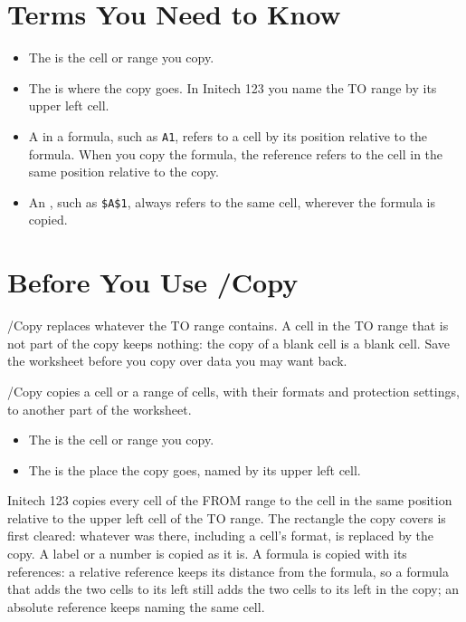 \section{Terms You Need to Know}
\begin{itemize}
\item The  is the cell or range you copy.
\item The  is where the copy goes.  In Initech 123 you name
  the TO range by its upper left cell.
\item A  in a formula, such as \texttt{A1}, refers
  to a cell by its position relative to the formula.  When you copy the
  formula, the reference refers to the cell in the same position relative
  to the copy.
\item An , such as \texttt{\$A\$1}, always refers
  to the same cell, wherever the formula is copied.
\end{itemize}

\section{Before You Use /Copy}
\begin{Caution}
/Copy replaces whatever the TO range contains.  A cell in the TO range that
is not part of the copy keeps nothing: the copy of a blank cell is a blank
cell.  Save the worksheet before you copy over data you may want back.
\end{Caution}

/Copy copies a cell or a range of cells, with their formats and protection
settings, to another part of the worksheet.


\begin{itemize}
\item The  is the cell or range you copy.
\item The  is the place the copy goes, named by its upper
  left cell.
\end{itemize}
Initech 123 copies every cell of the FROM range to the cell in the same
position relative to the upper left cell of the TO range.  The rectangle
the copy covers is first cleared: whatever was there, including a cell's
format, is replaced by the copy.  A label or a number is copied as it is.
A formula is copied with its references: a relative reference keeps its
distance from the formula, so a formula that adds the two cells to its left
still adds the two cells to its left in the copy; an absolute reference
keeps naming the same cell.

